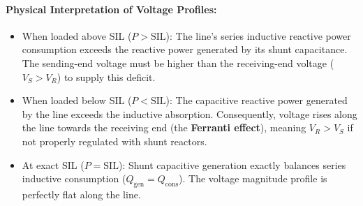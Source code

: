 \paragraph{Physical Interpretation of Voltage Profiles:}
\begin{itemize}
    \item When loaded above SIL ($P > \text{SIL}$): The line's series inductive reactive power consumption exceeds the reactive power generated by its shunt capacitance. The sending-end voltage must be higher than the receiving-end voltage ($V_S > V_R$) to supply this deficit.
    \item When loaded below SIL ($P < \text{SIL}$): The capacitive reactive power generated by the line exceeds the inductive absorption. Consequently, voltage rises along the line towards the receiving end (the \textbf{Ferranti effect}), meaning $V_R > V_S$ if not properly regulated with shunt reactors.
    \item At exact SIL ($P = \text{SIL}$): Shunt capacitive generation exactly balances series inductive consumption ($Q_{\text{gen}} = Q_{\text{cons}}$). The voltage magnitude profile is perfectly flat along the line.
\end{itemize}
